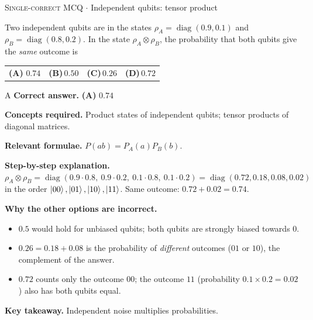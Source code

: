 \documentclass[11pt,a4paper]{article}
\newcommand{\optlabel}[1]{\textbf{(#1)}}
\newcommand{\correctlabel}[1]{\textcolor{okgreen}{\textbf{(#1)}\,\ding{51}}}
\newenvironment{qitem}[1]{\begin{list}{}{\setlength{\leftmargin}{3.3em}\setlength{\labelwidth}{3.1em}%
  \setlength{\labelsep}{0.2em}\setlength{\topsep}{3pt}\setlength{\parsep}{3pt}}\item[\textbf{Q.#1}\hfill]}{\end{list}}
\newcommand{\qsep}{\par\vspace{2pt}{\color{black!15}\hrule}\vspace{4pt}}
\newcommand{\qmeta}[2]{{\footnotesize\color{black!60}\textsc{#1} \;$\cdot$\; #2}\par}
\begin{document}
\begin{qitem}{13}
\qmeta{Single-correct MCQ}{Independent qubits: tensor product}
Two independent qubits are in the states $\rho_A = \operatorname{diag}(0.9, 0.1)$ and $\rho_B = \operatorname{diag}(0.8, 0.2)$. In the
state $\rho_A\otimes\rho_B$, the probability that both qubits give the \emph{same} outcome is
\par\smallskip\noindent\begin{tabularx}{\linewidth}{@{}*{4}{L}@{}}
\correctlabel{A}\,$0.74$ & \optlabel{B}\,$0.50$ & \optlabel{C}\,$0.26$ & \optlabel{D}\,$0.72$
\end{tabularx}
\end{qitem}
\begin{solbox}{A}
\textbf{\color{brand}Correct answer.} \textcolor{okgreen}{\textbf{(A)}} $0.74$

\textbf{\color{brand}Concepts required.} Product states of independent qubits; tensor products of diagonal matrices.

\textbf{\color{brand}Relevant formulae.} $P(ab) = P_A(a)P_B(b)$.

\textbf{\color{brand}Step-by-step explanation.} $\rho_A\otimes\rho_B = \operatorname{diag}(0.9\cdot0.8,\ 0.9\cdot0.2,\ 0.1\cdot0.8,\ 0.1\cdot0.2) = \operatorname{diag}(0.72, 0.18, 0.08, 0.02)$
in the order $\ket{00}, \ket{01}, \ket{10}, \ket{11}$. Same outcome: $0.72 + 0.02 = 0.74$.

\textbf{\color{brand}Why the other options are incorrect.}
\begin{itemize}[leftmargin=2.4em, itemsep=1pt, topsep=2pt]
\item[\textbf{(B)}] $0.5$ would hold for unbiased qubits; both qubits are strongly biased towards $0$.
\item[\textbf{(C)}] $0.26 = 0.18 + 0.08$ is the probability of \emph{different} outcomes ($01$ or $10$), the complement of the answer.
\item[\textbf{(D)}] $0.72$ counts only the outcome $00$; the outcome $11$ (probability $0.1\times0.2 = 0.02$) also has both qubits equal.
\end{itemize}
\textbf{\color{brand}Key takeaway.} Independent noise multiplies probabilities.
\end{solbox}
\qsep
\end{document}
